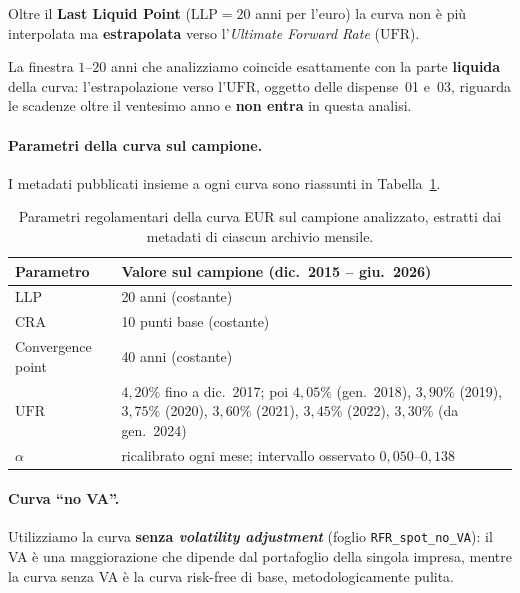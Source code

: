 \documentclass[11pt,a4paper]{article}
\newcommand{\UFR}{\ensuremath{\mathrm{UFR}}}
\newcommand{\LLP}{\ensuremath{\mathrm{LLP}}}
\newcommand{\CRA}{\ensuremath{\mathrm{CRA}}}
\theoremstyle{plain}
\theoremstyle{definition}
\theoremstyle{remark}
\begin{document}
Oltre il \textbf{Last Liquid Point} ($\LLP = 20$ anni per l'euro) la curva non
\`e pi\`u interpolata ma \textbf{estrapolata} verso l'\emph{Ultimate Forward
Rate} ($\UFR$).

\begin{keybox}
La finestra $1$--$20$ anni che analizziamo coincide esattamente con la parte
\textbf{liquida} della curva: l'estrapolazione verso l'$\UFR$, oggetto delle
dispense~01 e~03, riguarda le scadenze oltre il ventesimo anno e
\textbf{non entra} in questa analisi.
\end{keybox}

\paragraph{Parametri della curva sul campione.}
I metadati pubblicati insieme a ogni curva sono riassunti in
Tabella~\ref{tab:parametri}.

\begin{table}[H]
\centering
\small
\renewcommand{\arraystretch}{1.25}
\begin{tabular}{lp{9.2cm}}
\toprule
Parametro & Valore sul campione (dic.\ 2015 -- giu.\ 2026) \\
\midrule
$\LLP$ & 20 anni (costante) \\
$\CRA$ & 10 punti base (costante) \\
Convergence point & 40 anni (costante) \\
$\UFR$ & $4{,}20\%$ fino a dic.\ 2017; poi $4{,}05\%$ (gen.\ 2018),
         $3{,}90\%$ (2019), $3{,}75\%$ (2020), $3{,}60\%$ (2021),
         $3{,}45\%$ (2022), $3{,}30\%$ (da gen.\ 2024) \\
$\alpha$ & ricalibrato ogni mese; intervallo osservato $0{,}050$--$0{,}138$ \\
\bottomrule
\end{tabular}
\caption{Parametri regolamentari della curva EUR sul campione analizzato,
estratti dai metadati di ciascun archivio mensile.}
\label{tab:parametri}
\end{table}

\paragraph{Curva ``no VA''.}
Utilizziamo la curva \textbf{senza \emph{volatility adjustment}} (foglio
\texttt{RFR\_spot\_no\_VA}): il VA \`e una maggiorazione che dipende dal
portafoglio della singola impresa, mentre la curva senza VA \`e la curva
risk-free di base, metodologicamente pulita.
\end{document}
